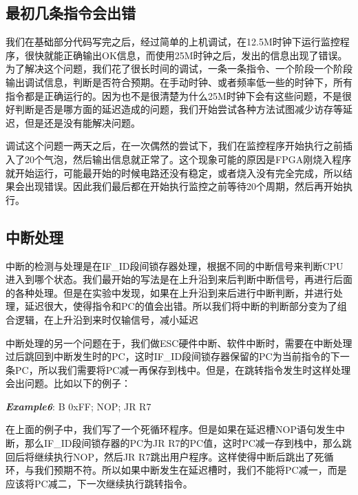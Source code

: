 
\subsection{最初几条指令会出错}
我们在基础部分代码写完之后，经过简单的上机调试，在12.5M时钟下运行监控程序，很快就能正确输出OK信息，而使用25M时钟之后，发出的信息出现了错误。为了解决这个问题，我们花了很长时间的调试，一条一条指令、一个阶段一个阶段输出调试信息，判断是否符合预期。在手动时钟、或者频率低一些的时钟下，所有指令都是正确运行的。因为也不是很清楚为什么25M时钟下会有这些问题，不是很好判断是否是哪方面的延迟造成的问题，我们开始尝试各种方法试图减少访存等延迟，但是还是没有能解决问题。

调试这个问题一两天之后，在一次偶然的尝试下，我们在监控程序开始执行之前插入了20个气泡，然后输出信息就正常了。这个现象可能的原因是FPGA刚烧入程序就开始运行，可能最开始的时候电路还没有稳定，或者烧入没有完全完成，所以结果会出现错误。因此我们最后都在开始执行监控之前等待20个周期，然后再开始执行。


\subsection{中断处理}

中断的检测与处理是在IF\_ID段间锁存器处理，根据不同的中断信号来判断CPU进入到哪个状态。我们最开始的写法是在上升沿到来后判断中断信号，再进行后面的各种处理。但是在实验中发现，如果在上升沿到来后进行中断判断，并进行处理，延迟很大，使得指令和PC的值会出错。所以我们将中断的判断部分变为了组合逻辑，在上升沿到来时仅输信号，减小延迟

中断处理的另一个问题在于，我们做ESC硬件中断、软件中断时，需要在中断处理过后跳回到中断发生时的PC，这时IF\_ID段间锁存器保留的PC为当前指令的下一条PC，所以我们需要将PC减一再保存到栈中。但是，在跳转指令发生时这样处理会出问题。比如以下的例子：

\textbf{\textit{Example6}}: \quad B 0xFF; \quad NOP; \quad JR R7

在上面的例子中，我们写了一个死循环程序。但是如果在延迟槽NOP语句发生中断，那么IF\_ID段间锁存器的PC为JR R7的PC值，这时PC减一存到栈中，那么跳回后将继续执行NOP，然后JR R7跳出用户程序。这样使得中断后跳出了死循环，与我们预期不符。所以如果中断发生在延迟槽时，我们不能将PC减一，而是应该将PC减二，下一次继续执行跳转指令。


